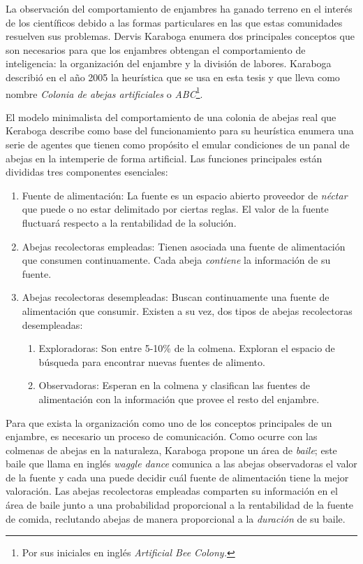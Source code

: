 La observación del comportamiento de enjambres ha ganado terreno en el interés
de los científicos debido a las formas particulares en las que estas comunidades
resuelven sus problemas. Dervis Karaboga enumera dos principales conceptos que
son necesarios para que los enjambres obtengan el comportamiento de
inteligencia: la organización del enjambre y la división de labores. Karaboga
describió en el año 2005 la heurística que se usa en esta tesis y que lleva como
nombre \textit{Colonia de abejas artificiales} o \textit{ABC}\footnote{Por sus
  iniciales en inglés \textit{Artificial Bee Colony.}}.

El modelo minimalista del comportamiento de una colonia de abejas real
que Keraboga describe como base del funcionamiento para su heurística
enumera una serie de agentes que tienen como propósito el emular condiciones
de un panal de abejas en la intemperie de forma artificial. Las funciones
principales están divididas tres componentes esenciales:

\begin{enumerate}
\item Fuente de alimentación: La fuente es un espacio abierto proveedor de
\textit{néctar} que puede o no estar delimitado por ciertas reglas. El valor
de la fuente fluctuará respecto a la rentabilidad de la solución.

\item Abejas recolectoras empleadas: Tienen asociada una fuente de alimentación que
consumen continuamente. Cada abeja \textit{contiene} la información de su
fuente.

\item Abejas recolectoras desempleadas: Buscan continuamente una fuente de
alimentación que consumir. Existen a su vez, dos tipos de abejas recolectoras
desempleadas:

\begin{enumerate}

\item Exploradoras: Son entre 5-10\% de la colmena. Exploran el espacio de búsqueda
para encontrar nuevas fuentes de alimento.

\item Observadoras: Esperan en la colmena y clasifican las fuentes de
alimentación con la información que provee el resto del enjambre.

\end{enumerate}
\end{enumerate}

Para que exista la organización como uno de los conceptos principales de un
enjambre, es necesario un proceso de comunicación. Como ocurre con las colmenas
de abejas en la naturaleza, Karaboga propone un área de \textit{baile}; este
baile que llama en inglés \textit{waggle dance} comunica a las abejas
observadoras el valor de la fuente y cada una puede decidir cuál fuente de
alimentación tiene la mejor valoración. Las abejas recolectoras empleadas
comparten su información en el área de baile junto a una probabilidad
proporcional a la rentabilidad de la fuente de comida, reclutando abejas
de manera proporcional a la \textit{duración} de su baile.

